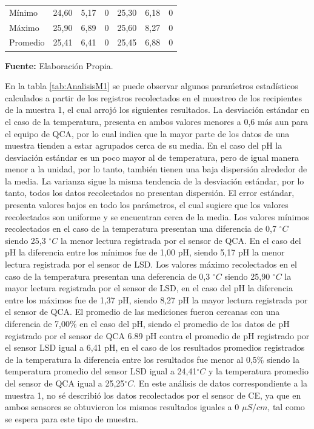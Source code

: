 \begin{table}[H]
\begin{tabular}{l ccc|ccc}
Mínimo  &   \multicolumn{1}{c}{24,60}  & \multicolumn{1}{r}{5,17} & 0 & \multicolumn{1}{c}{25,30} & \multicolumn{1}{r}{6,18} & 0 \\
Máximo  & \multicolumn{1}{c}{25,90}    & \multicolumn{1}{c}{6,89} & 0 & \multicolumn{1}{c}{25,60}  & \multicolumn{1}{c}{8,27} & 0  \\ 
Promedio & \multicolumn{1}{c}{25,41}   & \multicolumn{1}{c}{6,41} & 0 & \multicolumn{1}{c}{25,45} & \multicolumn{1}{c}{6,88} & 0 
\\ 
\hline
\end{tabular}
\vspace{5mm}
\newline
\hfill \textbf{Fuente: }Elaboración Propia.
\end{table}

En la tabla \ref{tab:AnalisisM1} se puede observar algunos para\'metros estad\'isticos calculados a partir de los registros recolectados en el muestreo de los recipientes de la muestra 1, el cual arrojó los siguientes resultados. 
La desviaci\'on est\'andar en el caso de la temperatura, presenta en ambos valores menores a 0,6 m\'as aun para el equipo de QCA, por lo cual indica que la mayor parte de los datos de una muestra tienden a estar agrupados cerca de su media. 
En el caso del pH la desviaci\'on est\'andar es un poco mayor al de temperatura, pero de igual manera menor a la unidad, por lo tanto, tambi\'en tienen una baja  dispersión alrededor de la media. 
La varianza sigue la misma tendencia de la desviaci\'on est\'andar, por lo tanto, todos los datos recolectados no presentan dispersi\'on. 
El error est\'andar, presenta valores bajos en todo los par\'ametros, el cual sugiere que los valores recolectados son uniforme y se encuentran cerca de la media. 
Los valores mínimos recolectados en el caso de la temperatura presentan una diferencia de 0,7 $ ^{\circ}C$ siendo 25,3 $ ^{\circ}C$ la menor lectura registrada por el sensor de QCA. 
En el caso del pH la diferencia entre los mínimos fue de 1,00 pH, siendo 5,17 pH la menor lectura registrada por el sensor de LSD. 
Los valores m\'aximo recolectados en el caso de la temperatura presentan una deferencia de 0,3 $ ^{\circ}C$ siendo 25,90 $ ^{\circ}C$ la mayor lectura registrada por el sensor de LSD, en el caso del pH la diferencia entre los m\'aximos fue de 1,37 pH, siendo 8,27 pH la mayor lectura registrada por el sensor de QCA. El promedio de las mediciones fueron cercanas con una diferencia de 7,00$\%$ en el caso del pH, siendo el promedio de los datos de pH registrado por el sensor de QCA 6.89 pH contra el promedio de pH registrado por el sensor LSD igual a 6,41 pH, en el caso de los resultados promedios registrados de la temperatura la diferencia entre los resultados fue menor al 0,5$\%$ siendo la temperatura promedio del sensor LSD igual a 24,41$ ^{\circ}C$ y la temperatura promedio del sensor de QCA igual a 25,25$^{\circ}C$. En este an\'alisis de datos correspondiente a la muestra 1, no sé describi\'o los datos recolectados por el sensor de CE, ya que en ambos sensores se obtuvieron los mismos resultados iguales a 0 $\mu S/cm$, tal como se espera para este tipo de muestra.
